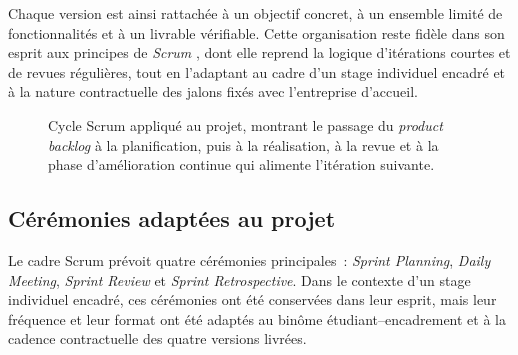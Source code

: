 \documentclass[12pt,a4paper]{report}
\begin{document}
Chaque version est ainsi rattachée à un objectif concret, à un ensemble limité de fonctionnalités et à un livrable vérifiable. Cette organisation reste fidèle dans son esprit aux principes de \textit{Scrum} \cite{scrum}, dont elle reprend la logique d'itérations courtes et de revues régulières, tout en l'adaptant au cadre d'un stage individuel encadré et à la nature contractuelle des jalons fixés avec l'entreprise d'accueil.

\begin{figure}[H]
\centering
{}
\caption[Cycle Scrum appliqué au projet]{Cycle Scrum appliqué au projet, montrant le passage du \textit{product backlog} à la planification, puis à la réalisation, à la revue et à la phase d'amélioration continue qui alimente l'itération suivante.}
\label{fig:scrum}
\end{figure}

\subsection*{Cérémonies adaptées au projet}
Le cadre Scrum prévoit quatre cérémonies principales~: \textit{Sprint Planning}, \textit{Daily Meeting}, \textit{Sprint Review} et \textit{Sprint Retrospective}. Dans le contexte d'un stage individuel encadré, ces cérémonies ont été conservées dans leur esprit, mais leur fréquence et leur format ont été adaptés au binôme étudiant--encadrement et à la cadence contractuelle des quatre versions livrées.
\end{document}
